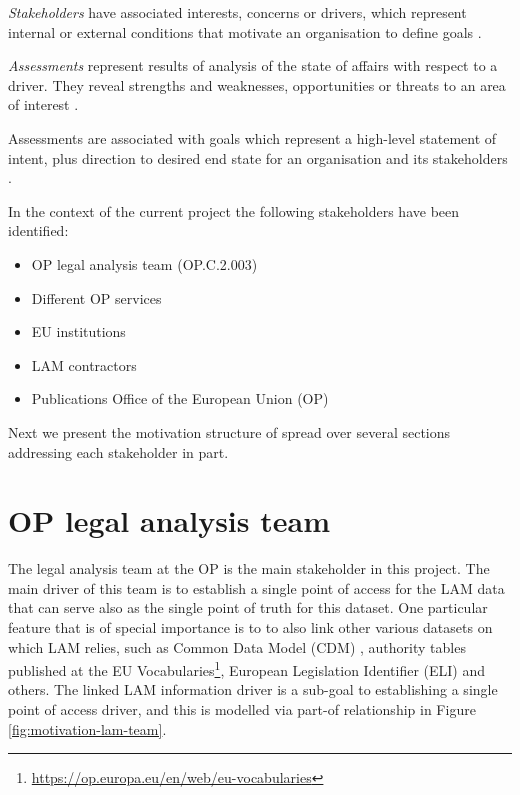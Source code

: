 	\textit{Stakeholders} have associated interests, concerns or drivers, which represent internal or external conditions that motivate an organisation to define goals \citep{archimate3.1}.
	
	 
	\textit{Assessments} represent results of analysis of the state of affairs with respect to a driver. They reveal strengths and weaknesses, opportunities or threats to an area of interest \citep{archimate3.1}.
	
	Assessments are associated with goals which represent a high-level statement of intent, plus direction to desired end state for an organisation and its stakeholders \citep{archimate3.1}. 
	
	In the context of the current project the following stakeholders have been identified:
	
	\begin{itemize}
		\item OP legal analysis team (OP.C.2.003)
		\item Different OP services
		\item EU institutions
		\item LAM contractors
		\item Publications Office of the European Union (OP)
	\end{itemize}

	Next we present the motivation structure of spread over several sections addressing each stakeholder in part.
	
	\section{OP legal analysis team}

	The legal analysis team at the OP is the main stakeholder in this project. The main driver of this team is to establish a single point of access for the LAM data that can serve also as the single point of truth for this dataset. One particular feature that is of special importance is to to also link other various datasets on which LAM relies, such as Common Data Model (CDM) \citep{cdm-francesconi2015ontology, cdm-francesconi2015semantic}, authority tables published at the EU Vocabularies\footnote{\url{https://op.europa.eu/en/web/eu-vocabularies}}, European Legislation Identifier (ELI) and others. The linked LAM information driver is a sub-goal to establishing a single point of access driver, and this is modelled via part-of relationship in Figure \ref{fig:motivation-lam-team}.
	
